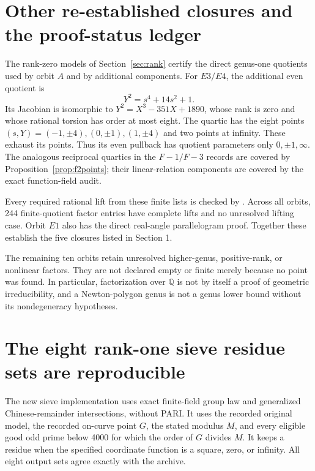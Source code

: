 \documentclass[11pt]{article}
\theoremstyle{remark}\newtheorem{remark}[theorem]{Remark}
\newcommand{\Q}{\mathbb Q}\newcommand{\Z}{\mathbb Z}
\begin{document}
\section{Other re-established closures and the proof-status ledger}
The rank-zero models of Section~\ref{sec:rank} certify the direct genus-one quotients used by orbit $A$ and by additional components. For $E3/E4$, the additional even quotient is
\[
Y^2=s^4+14s^2+1.
\]
Its Jacobian is isomorphic to $Y^2=X^3-351X+1890$, whose rank is zero and whose rational torsion has order at most eight. The quartic has the eight points $(s,Y)=(-1,\pm4),(0,\pm1),(1,\pm4)$ and two points at infinity. These exhaust its points. Thus its even pullback has quotient parameters only $0,\pm1,\infty$. The analogous reciprocal quartics in the $F{-}1/F{-}3$ records are covered by Proposition~\ref{prop:f2points}; their linear-relation components are covered by the exact function-field audit.

Every required rational lift from these finite lists is checked by . Across all orbits, 244 finite-quotient factor entries have complete lifts and no unresolved lifting case. Orbit $E1$ also has the direct real-angle parallelogram proof. Together these establish the five closures listed in Section 1.

The remaining ten orbits retain unresolved higher-genus, positive-rank, or nonlinear factors. They are not declared empty or finite merely because no point was found. In particular, factorization over $\Q$ is not by itself a proof of geometric irreducibility, and a Newton-polygon genus is not a genus lower bound without its nondegeneracy hypotheses.

\section{The eight rank-one sieve residue sets are reproducible}
The new sieve implementation uses exact finite-field group law and generalized Chinese-remainder intersections, without PARI. It uses the recorded original model, the recorded on-curve point $G$, the stated modulus $M$, and every eligible good odd prime below 4000 for which the order of $G$ divides $M$. It keeps a residue when the specified coordinate function is a square, zero, or infinity. All eight output sets agree exactly with the archive.
\end{document}
